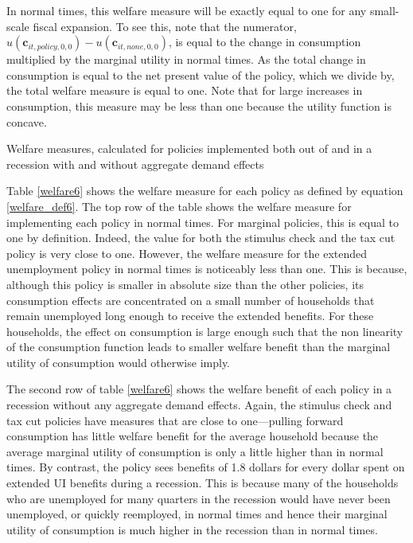 \documentclass[\econtexRoot/HAFiscal]{subfiles}
\begin{document}
In normal times, this welfare measure will be exactly equal to one for any small-scale fiscal expansion. To see this, note that the numerator,  $u(\mathbf{c}_{it,\textit{policy},0,0}) - u(\mathbf{c}_{it,\textit{none},0,0})$, is equal to the change in consumption multiplied by the marginal utility in normal times. As the total change in consumption is equal to the net present value of the policy, which we divide by, the total welfare measure is equal to one. Note that for large increases in consumption, this measure may be less than one because the utility function is concave.

\begin{table}[ht] 
	\center
	
	\caption{Welfare measures, calculated for policies implemented both out of and in a recession with and without aggregate demand effects}
	\notinsubfile{\label{welfare6}}
\end{table}

Table \ref{welfare6} shows the welfare measure for each policy as defined by equation \eqref{welfare_def6}. The top row of the table shows the welfare measure for implementing each policy in normal times. For marginal policies, this is equal to one by definition. Indeed, the value for both the stimulus check and the tax cut policy is very close to one. However, the welfare measure for the extended unemployment policy in normal times is noticeably less than one. This is because, although this policy is smaller in absolute size than the other policies, its consumption effects are concentrated on a small number of households that remain unemployed long enough to receive the extended benefits. For these households, the effect on consumption is large enough such that the non linearity of the consumption function leads to smaller welfare benefit than the marginal utility of consumption would otherwise imply.

The second row of table \ref{welfare6} shows the welfare benefit of each policy in a recession without any aggregate demand effects. Again, the stimulus check and tax cut policies have measures that are close to one---pulling forward consumption has little welfare benefit for the average household because the average marginal utility of consumption is only a little higher than in normal times. By contrast, the policy sees benefits of 1.8 dollars for every dollar spent on extended UI benefits during a recession. This is because many of the households who are unemployed for many quarters in the recession would have never been unemployed, or quickly reemployed, in normal times and hence their marginal utility of consumption is much higher in the recession than in normal times.
\end{document}
